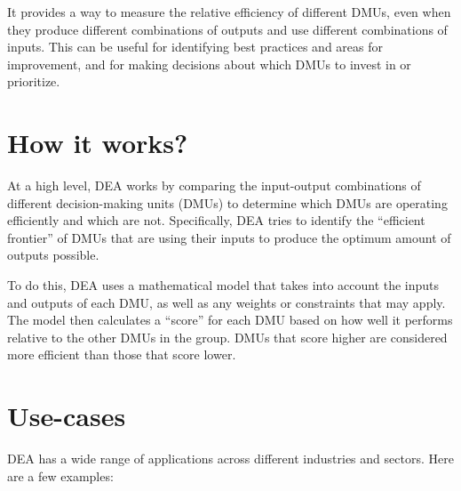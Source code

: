\documentclass[
]{book}
\begin{document}
It provides a way to measure the relative efficiency of different DMUs, even when they produce different combinations of outputs and use different combinations of inputs. This can be useful for identifying best practices and areas for improvement, and for making decisions about which DMUs to invest in or prioritize.

\hypertarget{how-it-works}{%
\section{How it works?}\label{how-it-works}}

At a high level, DEA works by comparing the input-output combinations of different decision-making units (DMUs) to determine which DMUs are operating efficiently and which are not. Specifically, DEA tries to identify the ``efficient frontier'' of DMUs that are using their inputs to produce the optimum amount of outputs possible.

To do this, DEA uses a mathematical model that takes into account the inputs and outputs of each DMU, as well as any weights or constraints that may apply. The model then calculates a ``score'' for each DMU based on how well it performs relative to the other DMUs in the group. DMUs that score higher are considered more efficient than those that score lower.

\hypertarget{use-cases}{%
\section{Use-cases}\label{use-cases}}

DEA has a wide range of applications across different industries and sectors. Here are a few examples:
\end{document}
